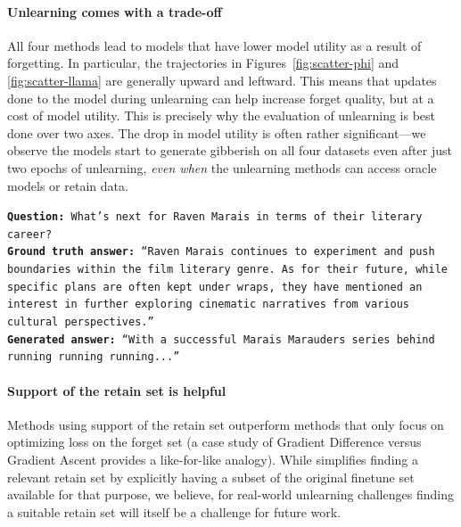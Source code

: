 \paragraph{Unlearning comes with a trade-off} 
All four methods lead to models that have lower model utility as a result of forgetting.
In particular, the trajectories in Figures~\ref{fig:scatter-phi} and \ref{fig:scatter-llama} are generally upward and leftward.
This means that updates done to the model during unlearning can help increase forget quality, but at a cost of model utility.
This is precisely why the evaluation of unlearning is best done over two axes. 
The drop in model utility is often rather significant---we observe the models start to generate gibberish on all four datasets even after just two epochs of unlearning, \emph{even when} the unlearning methods can access oracle models or retain data. 

\begin{tcolorbox}[title={Sample question and answer from the forget set along with a generated answer from an unlearned Llama-2-7B (KL Minimization after two epochs).},  colback=gray!20, colframe=gray!75, rounded corners, sharp corners=northeast, sharp corners=southwest]
\footnotesize
\texttt{\textbf{Question:} What's next for Raven Marais in terms of their literary career?} \\
\texttt{\textbf{Ground truth answer:} ``Raven Marais continues to experiment and push boundaries within the film literary genre. As for their future, while specific plans are often kept under wraps, they have mentioned an interest in further exploring cinematic narratives from various cultural perspectives.''}\\
\texttt{\textbf{Generated answer:} ``With a successful Marais Marauders series behind running running running...''}
\\
\end{tcolorbox}


\paragraph{Support of the retain set is helpful}
Methods using support of the retain set outperform methods that only focus on optimizing loss on the forget set (a case study of Gradient Difference versus Gradient Ascent provides a like-for-like analogy). 
While \tofu{} simplifies finding a relevant retain set by explicitly having a subset of the original finetune set available for that purpose, we believe, for real-world unlearning challenges finding a suitable retain set will itself be a challenge for future work.

